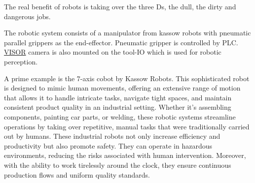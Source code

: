 The real benefit of robots is taking over the three Ds, the dull, the dirty and dangerous jobs. \cite{jordan2016robots}

The robotic system consists of a manipulator from kassow robots with pneumatic parallel grippers as the end-effector.
Pneumatic gripper is controlled by PLC. \hyperref[acro:VISOR]{VISOR\textsuperscript{\textregistered}} camera is also mounted on the tool-IO which is used for robotic perception.

A prime example is the 7-axis cobot by Kassow Robots. This sophisticated robot is designed to mimic human movements, offering an extensive range of motion that allows it to handle intricate tasks, navigate tight spaces, and maintain consistent product quality in an industrial setting.
Whether it's assembling components, painting car parts, or welding, these robotic systems streamline operations by taking over repetitive, manual tasks that were traditionally carried out by humans.
These industrial robots not only increase efficiency and productivity but also promote safety.
They can operate in hazardous environments, reducing the risks associated with human intervention. 
Moreover, with the ability to work tirelessly around the clock, they ensure continuous production flows and uniform quality standards.
\cite{kassowrobotsblog}

